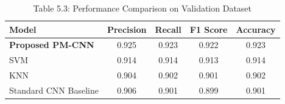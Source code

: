 \begin{table}[htbp]
\centering
\caption{Table 5.3: Performance Comparison on Validation Dataset}
\label{tab:val_perf}
\begin{tabular}{lcccc}
\toprule
\textbf{Model} & \textbf{Precision} & \textbf{Recall} & \textbf{F1 Score} & \textbf{Accuracy} \\
\midrule
\textbf{Proposed PM-CNN}       &   0.925    &   0.923    &   0.922    &   0.923    \\
SVM                            &   0.914    &   0.914    &   0.913    &   0.914    \\
KNN                            &   0.904    &   0.902    &   0.901    &   0.902    \\
Standard CNN Baseline          &   0.906    &   0.901    &   0.899    &   0.901    \\
\bottomrule
\end{tabular}
\end{table}
